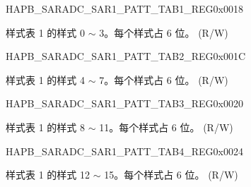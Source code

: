 \begin{register}{H}{APB\_SARADC\_SAR1\_PATT\_TAB1\_REG}{0x{}0018}\label{regdesc:APBSARADCSAR1PATTTAB1REG}
%
%
\regnewline%
\begin{regdesc}\begin{reglist}
\label{fielddesc:APBSARADCSAR1PATTTAB1}\item [APB\_SARADC\_SAR1\_PATT\_TAB1] 样式表 1 的样式 0 $\sim$ 3。每个样式占 6 位。 (R/W)
\end{reglist}\end{regdesc}
\end{register}


\begin{register}{H}{APB\_SARADC\_SAR1\_PATT\_TAB2\_REG}{0x{}001C}\label{regdesc:APBSARADCSAR1PATTTAB2REG}
%
%
\regnewline%
\begin{regdesc}\begin{reglist}
\label{fielddesc:APBSARADCSAR1PATTTAB2}\item [APB\_SARADC\_SAR1\_PATT\_TAB2] 样式表 1 的样式 4 $\sim$ 7。每个样式占 6 位。 (R/W)
\end{reglist}\end{regdesc}
\end{register}


\begin{register}{H}{APB\_SARADC\_SAR1\_PATT\_TAB3\_REG}{0x{}0020}\label{regdesc:APBSARADCSAR1PATTTAB3REG}
%
%
\regnewline%
\begin{regdesc}\begin{reglist}
\label{fielddesc:APBSARADCSAR1PATTTAB3}\item [APB\_SARADC\_SAR1\_PATT\_TAB3] 样式表 1 的样式 8 $\sim$ 11。每个样式占 6 位。 (R/W)
\end{reglist}\end{regdesc}
\end{register}


\begin{register}{H}{APB\_SARADC\_SAR1\_PATT\_TAB4\_REG}{0x{}0024}\label{regdesc:APBSARADCSAR1PATTTAB4REG}
%
%
\regnewline%
\begin{regdesc}\begin{reglist}
\label{fielddesc:APBSARADCSAR1PATTTAB4}\item [APB\_SARADC\_SAR1\_PATT\_TAB4] 样式表 1 的样式 12 $\sim$ 15。每个样式占 6 位。 (R/W)
\end{reglist}\end{regdesc}
\end{register}



